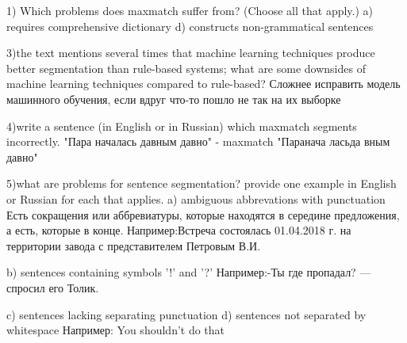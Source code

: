 1) Which problems does maxmatch suffer from? (Choose all that apply.)
a) requires comprehensive dictionary
d) constructs non-grammatical sentences


3)the text mentions several times that machine learning techniques produce better segmentation than rule-based systems; what are some downsides of machine learning techniques compared to rule-based?
Сложнее исправить модель машинного обучения, если вдруг что-то пошло не так на их выборке  
  
4)write a sentence (in English or in Russian) which maxmatch segments incorrectly.
  "Пара началась давным давно" - maxmatch "Паранача ласьда вным давно"
  
5)what are problems for sentence segmentation? provide one example in English or Russian for each that applies.
a) ambiguous abbrevations with punctuation
Есть сокращения или аббревиатуры, которые находятся в середине предложения, а есть, которые в конце.   
Например:Встреча состоялась 01.04.2018 г. на территории завода с представителем Петровым В.И.

b) sentences containing symbols '!' and '?'
Например:-Ты где пропадал? — спросил его Толик.

c) sentences lacking separating punctuation
d) sentences not separated by whitespace
Например: You shouldn’t do that